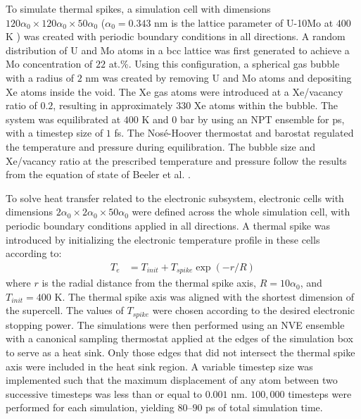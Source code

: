 \documentclass[review]{elsarticle}
\providecommand{\DIFadd}[1]{{\bf #1}} %
\providecommand{\DIFdel}[1]{} %
\providecommand{\DIFaddbegin}{\protect\color{blue}} %
\providecommand{\DIFaddend}{\protect\color{black}} %
\providecommand{\DIFdelbegin}{\protect\color{red}} %
\providecommand{\DIFdelend}{\protect\color{black}} %
\newcommand{\DIFscaledelfig}{0.5}
\newlength{\DIFdelgraphicswidth} %
\newlength{\DIFdelgraphicsheight} %
\newcommand{\DIFaddincludegraphics}[2][]{{\color{blue}\fbox{\DIFOincludegraphics[#1]{#2}}}} %
\newcommand{\DIFdelincludegraphics}[2][]{%
\sbox{\DIFdelgraphicsbox}{\DIFOincludegraphics[#1]{#2}}%
\settoboxwidth{\DIFdelgraphicswidth}{\DIFdelgraphicsbox} %
\settoboxtotalheight{\DIFdelgraphicsheight}{\DIFdelgraphicsbox} %
\scalebox{\DIFscaledelfig}{%
\parbox[b]{\DIFdelgraphicswidth}{\usebox{\DIFdelgraphicsbox}\\[-\baselineskip] \rule{\DIFdelgraphicswidth}{0em}}\llap{\resizebox{\DIFdelgraphicswidth}{\DIFdelgraphicsheight}{%
\setlength{\unitlength}{\DIFdelgraphicswidth}%
\begin{picture}(1,1)%
\thicklines\linethickness{2pt} %
{\color[rgb]{1,0,0}\put(0,0){\framebox(1,1){}}}%
{\color[rgb]{1,0,0}\put(0,0){\line( 1,1){1}}}%
{\color[rgb]{1,0,0}\put(0,1){\line(1,-1){1}}}%
\end{picture}%
}\hspace*{3pt}}} %
} %
\DeclareRobustCommand{\DIFaddbegin}{\DIFOaddbegin \let\includegraphics\DIFaddincludegraphics} %
\DeclareRobustCommand{\DIFaddend}{\DIFOaddend \let\includegraphics\DIFOincludegraphics} %
\DeclareRobustCommand{\DIFdelbegin}{\DIFOdelbegin \let\includegraphics\DIFdelincludegraphics} %
\DeclareRobustCommand{\DIFdelend}{\DIFOaddend \let\includegraphics\DIFOincludegraphics} %
\begin{document}
To simulate thermal spikes, a simulation cell with dimensions $120 \alpha_0 \times 120 \alpha_0 \times 50 \alpha_0$ ($\alpha_0 = 0.343$ nm is the lattice parameter of U-10Mo at $400$ K \cite{phillips2010}) was created with periodic boundary conditions in all directions. A random distribution of U and Mo atoms in a bcc lattice was first generated to achieve a Mo concentration of $22$ at.\%. Using this configuration, a spherical gas bubble with a radius of $2$ nm was created by removing U and Mo atoms and depositing Xe atoms inside the void. The Xe gas atoms were introduced at a Xe/vacancy ratio of $0.2$, resulting in approximately $330$ Xe atoms within the bubble. The system was equilibrated at $400$ K and $0$ bar by using an NPT ensemble for \DIFdelbegin \DIFdel{$10$ }\DIFdelend \DIFaddbegin \DIFadd{$100$ }\DIFaddend ps, with a timestep size of $1$ fs. The Nos\'e-Hoover thermostat and barostat regulated the temperature and pressure during equilibration. The bubble size and Xe/vacancy ratio at the prescribed temperature and pressure follow the results from the equation of state \DIFaddbegin \DIFadd{(EOS) }\DIFaddend of Beeler et al. \cite{beeler2020improved}.

To solve heat transfer related to the electronic subsystem, electronic cells with dimensions $2 \alpha_0 \times 2 \alpha_0 \times 50 \alpha_0$ were defined across the whole simulation cell, with periodic boundary conditions applied in all directions. A thermal spike was introduced by initializing the electronic temperature profile in these cells according to:
\begin{align}
	T_e &= T_{init} + T_{spike} \exp\left( -r / R \right)
\end{align}
where $r$ is the radial distance from the thermal spike axis, $R = 10 \alpha_0$, and $T_{init} = 400$ K. The thermal spike axis was aligned with the shortest dimension of the supercell. The values of $T_{spike}$ were chosen according to the desired electronic stopping power. The simulations were then performed using an NVE ensemble with a canonical sampling thermostat \cite{bussi2007} applied at the edges of the simulation box to serve as a heat sink. Only those edges that did not intersect the thermal spike axis were included in the heat sink region. A variable timestep size was implemented such that the maximum displacement of any atom between two successive timesteps was less than or equal to $0.001$ nm. $100,000$ timesteps were performed for each simulation, yielding $80$--$90$ ps of total simulation time.
\end{document}
